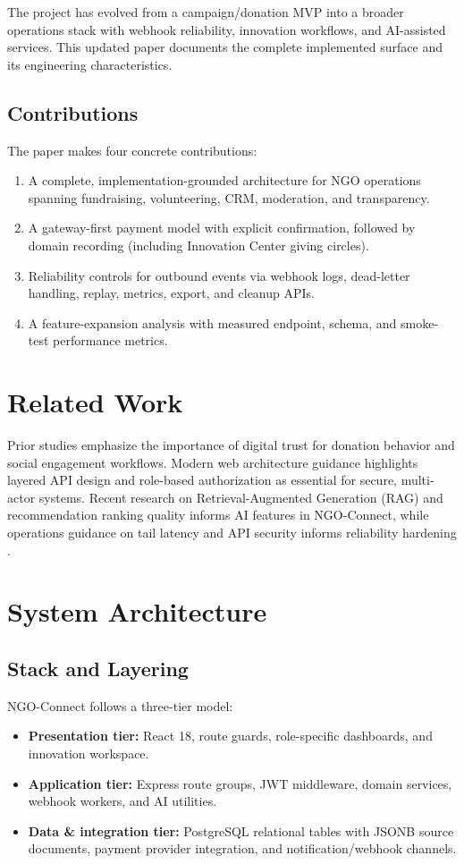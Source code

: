 \documentclass[conference]{IEEEtran}
\begin{document}
The project has evolved from a campaign/donation MVP into a broader operations stack with webhook reliability, innovation workflows, and AI-assisted services. This updated paper documents the complete implemented surface and its engineering characteristics.

\subsection{Contributions}
The paper makes four concrete contributions:
\begin{enumerate}
  \item A complete, implementation-grounded architecture for NGO operations spanning fundraising, volunteering, CRM, moderation, and transparency.
  \item A gateway-first payment model with explicit confirmation, followed by domain recording (including Innovation Center giving circles).
  \item Reliability controls for outbound events via webhook logs, dead-letter handling, replay, metrics, export, and cleanup APIs.
  \item A feature-expansion analysis with measured endpoint, schema, and smoke-test performance metrics.
\end{enumerate}

\section{Related Work}
Prior studies emphasize the importance of digital trust for donation behavior and social engagement workflows. Modern web architecture guidance highlights layered API design and role-based authorization as essential for secure, multi-actor systems. Recent research on Retrieval-Augmented Generation (RAG) and recommendation ranking quality informs AI features in NGO-Connect, while operations guidance on tail latency and API security informs reliability hardening \cite{reactdocs,expressdocs,postgresdocs,jwt,rfc_tail,rag,owaspapi}.

\section{System Architecture}
\subsection{Stack and Layering}
NGO-Connect follows a three-tier model:
\begin{itemize}
  \item \textbf{Presentation tier:} React 18, route guards, role-specific dashboards, and innovation workspace.
  \item \textbf{Application tier:} Express route groups, JWT middleware, domain services, webhook workers, and AI utilities.
  \item \textbf{Data \& integration tier:} PostgreSQL relational tables with JSONB source documents, payment provider integration, and notification/webhook channels.
\end{itemize}
\end{document}
